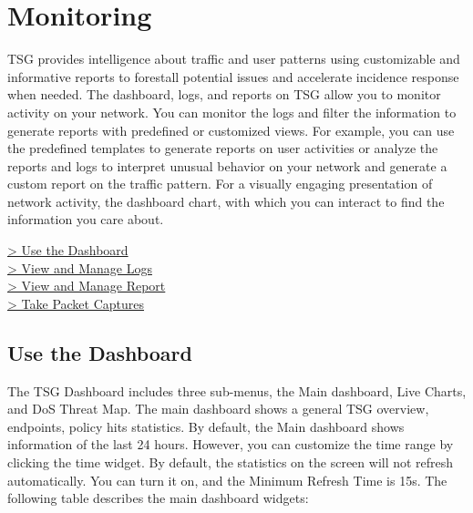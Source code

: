 %
\chapter*{\hypertarget{link:Monitoring}{Monitoring}}
\label{sec:monitor}

TSG provides intelligence about traffic and user patterns using customizable and informative reports to forestall potential issues and accelerate incidence response when needed. 
The dashboard, logs, and reports on TSG allow you to monitor activity on your network. You can monitor the logs and filter the information to generate reports with predefined or 
customized views. For example, you can use the predefined templates to generate reports on user activities or analyze the reports and logs to interpret unusual behavior 
on your network and generate a custom report on the traffic pattern. For a visually engaging presentation of network activity, the dashboard chart, 
with which you can interact to find the information you care about. 
 

{
\color{linkblue}
\hyperlink{link:Use the Dashboard}{> Use the Dashboard} \\
\hyperlink{link:View and Manage Logs}{> View and Manage Logs} \\
\hyperlink{link:View and Manage Report}{> View and Manage Report}\\
\hyperlink{link:Take Packet Captures}{> Take Packet Captures}\\
}
\clearpage

\section*{\hypertarget{link:Use the Dashboard}{Use the Dashboard}}
\label{sec:monitor:dashboard}

The TSG Dashboard includes three sub-menus, the Main dashboard, Live Charts, and DoS Threat Map. The main dashboard shows a general TSG overview, endpoints, 
policy hits statistics. By default, the Main dashboard shows information of the last 24 hours. However, you can customize the time range by clicking the time widget. 
By default, the statistics on the screen will not refresh automatically. You can turn it on, and the Minimum Refresh Time is 15s. 
The following table describes the main dashboard widgets:


